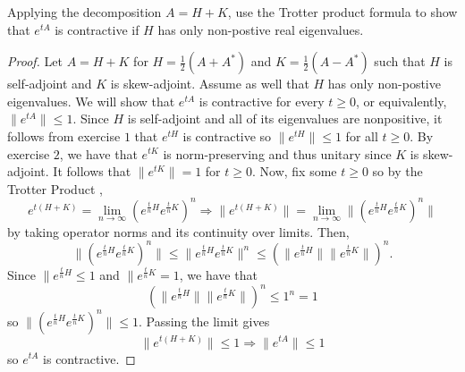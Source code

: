 \documentclass{exam}
\begin{document}
\begin{questions}
        \question Applying the decomposition $A = H + K$, use the Trotter product formula to show that $e^{tA}$ is contractive if $H$ has only non-postive real eigenvalues. 
        \begin{solution}
            \begin{proof}
                Let $A = H + K$ for $H = \frac{1}{2}\left(A + A^*\right)$ and $K = \frac{1}{2}\left(A - A^*\right)$ such that $H$ is self-adjoint and $K$ is skew-adjoint. Assume as well that $H$ has only non-postive eigenvalues. We will show that $e^{tA}$ is contractive for every $t \geq 0$, or equivalently, $\| e^{tA} \| \leq 1$. Since $H$ is self-adjoint and all of its eigenvalues are nonpositive, it follows from exercise $1$ that $e^{tH}$ is contractive so $\| e^{tH} \| \leq 1$ for all $t \geq 0$. By exercise $2$, we have that $e^{tK}$ is norm-preserving and thus unitary since $K$ is skew-adjoint. It follows that $\|e^{tK}\| = 1$ for $t \geq 0$. Now, fix some $t \geq 0$ so by the Trotter Product , 
                \[
                    e^{t(H+K)} = \lim_{n\to\infty}\left(e^{\frac{t}{n}H}e^{\frac{t}{n}K}\right)^n \Rightarrow \| e^{t(H+K)} \| = \lim_{n\to\infty} \|(e^{\frac{t}{n}H}e^{\frac{t}{n}K})^{n}\|
                \]
                by taking operator norms and its continuity over limits. Then, 
                \[
                    \|\left(e^{\frac{t}{n}H} e^{\frac{t}{n}K}\right)^{n}\| \leq \| e^{\frac{t}{n}H} e^{\frac{t}{n}K} \|^{n} \leq \left(\|e^{\frac{t}{n}H}\| \|e^{\frac{t}{n}K}\|\right)^{n}.
                \]
                Since $\|e^{\frac{t}{n}H} \leq 1$ and $\|e^{\frac{t}{n}K} = 1$, we have that 
                \[
                    \left(\|e^{\frac{t}{n}H}\| \|e^{\frac{t}{n}K}\|\right)^{n} \leq 1^{n} = 1
                \]
                so $\| (e^{\frac{t}{n}H} e^{\frac{t}{n}K})^n \| \leq 1$. Passing the limit gives 
                \[
                    \|e^{t(H+K)}\| \leq 1 \Rightarrow \| e^{tA} \| \leq 1
                \]
                so $e^{tA}$ is contractive. 
            \end{proof}
        \end{solution}


\end{questions}
\end{document}
